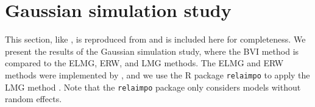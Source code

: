 \section{Gaussian simulation study}
\label{sec:simulation_study_gauss}
This section, like , is reproduced from \citet{Arnstad:Relative_variable_importance_in_Bayesian_linear_mixed_models:2024} and is included here for completeness. We present the results of the Gaussian simulation study, where the BVI method is compared to the ELMG, ERW, and LMG methods. The ELMG and ERW methods were implemented by \citet{matre}, and we use the R package \texttt{relaimpo} to apply the LMG method \citep{gromping_relaimpo}. Note that the \texttt{relaimpo} package only considers models without random effects.
